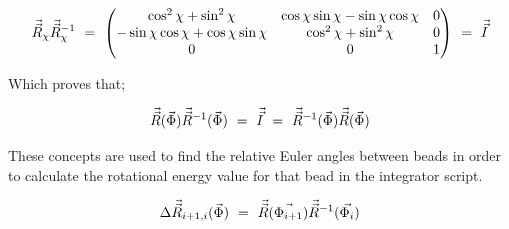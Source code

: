 \documentclass{ece}
\begin{document}
\begin{equation}
\vec{\vec{R}}_{\chi} \vec{\vec{R}}_{\chi}^{-1} 
\hspace{0.125cm} = \hspace{0.125cm} 
\begin{pmatrix}
\cos^{2}{\chi} + \sin^{2}{\chi} & \cos{\chi} \sin{\chi} - \sin{\chi} \cos{\chi} & 0 \\
- \sin{\chi} \cos{\chi} + \cos{\chi} \sin{\chi} & \cos^{2}{\chi} + \sin^{2}{\chi} & 0 \\
0 & 0 & 1 
\end{pmatrix}
\hspace{0.125cm} = \hspace{0.125cm} \vec{\vec{I}}
\end{equation}

Which proves that;

\begin{equation}
    \vec{\vec{R}} ( \vec{\Phi} )  \vec{\vec{R}}^{-1} ( \vec{\Phi} ) \hspace{0.125cm} = \hspace{0.125cm} \vec{\vec{I}}  \hspace{0.125cm} = \hspace{0.125cm}  \vec{\vec{R}}^{-1} ( \vec{\Phi} )  \vec{\vec{R}} ( \vec{\Phi} )
\end{equation}

These concepts are used to find the relative Euler angles between beads in order to calculate the rotational energy value for that bead in the integrator script. 

\begin{equation}
    \Delta \vec{\vec{R}}_{i+1, i} ( \vec{\Phi} )  \hspace{0.125cm} = \hspace{0.125cm} \vec{\vec{R}} ( \vec{\Phi_{i+1}} )  \vec{\vec{R}}^{-1} ( \vec{\Phi_{i}} ) 
\end{equation}
\end{document}
